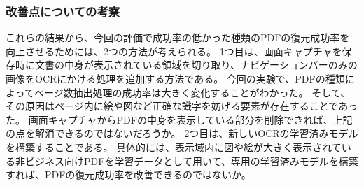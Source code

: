 \subsubsection{改善点についての考察}
これらの結果から、今回の評価で成功率の低かった種類のPDFの復元成功率を向上させるためには、2つの方法が考えられる。
1つ目は、画面キャプチャを保存時に文書の中身が表示されている領域を切り取り、ナビゲーションバーのみの画像をOCRにかける処理を追加する方法である。
今回の実験で、PDFの種類によってページ数抽出処理の成功率は大きく変化することがわかった。
そして、その原因はページ内に絵や図など正確な識字を妨げる要素が存在することであった。
画面キャプチャからPDFの中身を表示している部分を削除できれば、上記の点を解消できるのではないだろうか。
2つ目は、新しいOCRの学習済みモデルを構築することである。
具体的には、表示域内に図や絵が大きく表示されている非ビジネス向けPDFを学習データとして用いて、専用の学習済みモデルを構築すれば、PDFの復元成功率を改善できるのではないか。
